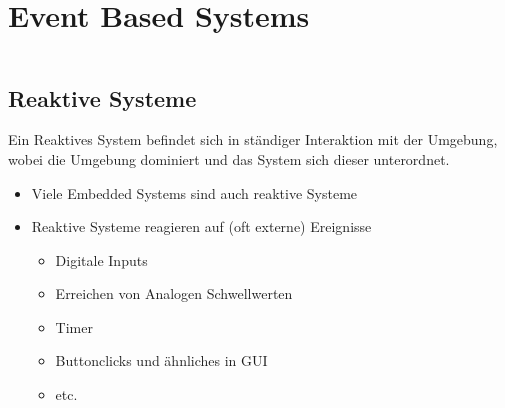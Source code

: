 \section{Event Based Systems }
\begin{lstlisting}

\end{lstlisting}
\subsection{Reaktive Systeme }
Ein Reaktives System befindet sich in ständiger Interaktion mit der Umgebung, wobei die Umgebung dominiert und das System sich dieser unterordnet.
\begin{itemize}
	\item Viele Embedded Systems sind auch reaktive Systeme
	\item Reaktive Systeme reagieren auf (oft externe) Ereignisse
	\begin{itemize}
	\item Digitale Inputs
	\item Erreichen von Analogen Schwellwerten
	\item Timer
	\item Buttonclicks und ähnliches in GUI
	\item etc.
	\end{itemize}
\end{itemize}
